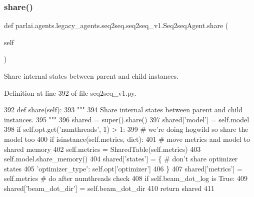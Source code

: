 \subsubsection{\texorpdfstring{share()}{share()}}
{\footnotesize\ttfamily def parlai.\+agents.\+legacy\+\_\+agents.\+seq2seq.\+seq2seq\+\_\+v1.\+Seq2seq\+Agent.\+share (\begin{DoxyParamCaption}\item[{}]{self }\end{DoxyParamCaption})}

\begin{DoxyVerb}Share internal states between parent and child instances.
\end{DoxyVerb}
 

Definition at line 392 of file seq2seq\+\_\+v1.\+py.


\begin{DoxyCode}
392     \textcolor{keyword}{def }share(self):
393         \textcolor{stringliteral}{"""}
394 \textcolor{stringliteral}{        Share internal states between parent and child instances.}
395 \textcolor{stringliteral}{        """}
396         shared = super().share()
397         shared[\textcolor{stringliteral}{'model'}] = self.model
398         \textcolor{keywordflow}{if} self.opt.get(\textcolor{stringliteral}{'numthreads'}, 1) > 1:
399             \textcolor{comment}{# we're doing hogwild so share the model too}
400             \textcolor{keywordflow}{if} isinstance(self.metrics, dict):
401                 \textcolor{comment}{# move metrics and model to shared memory}
402                 self.metrics = SharedTable(self.metrics)
403                 self.model.share\_memory()
404             shared[\textcolor{stringliteral}{'states'}] = \{  \textcolor{comment}{# don't share optimizer states}
405                 \textcolor{stringliteral}{'optimizer\_type'}: self.opt[\textcolor{stringliteral}{'optimizer'}]
406             \}
407         shared[\textcolor{stringliteral}{'metrics'}] = self.metrics  \textcolor{comment}{# do after numthreads check}
408         \textcolor{keywordflow}{if} self.beam\_dot\_log \textcolor{keywordflow}{is} \textcolor{keyword}{True}:
409             shared[\textcolor{stringliteral}{'beam\_dot\_dir'}] = self.beam\_dot\_dir
410         \textcolor{keywordflow}{return} shared
411 
\end{DoxyCode}
\mbox{\label{classparlai_1_1agents_1_1legacy__agents_1_1seq2seq_1_1seq2seq__v1_1_1Seq2seqAgent_a59a524e15577396e60a1e5f8b6bfe9a7}} 
